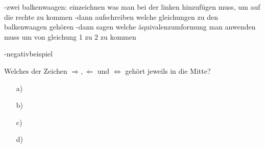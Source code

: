 \documentclass[solution]{uebungsblatt}
\begin{document}
-zwei balkenwaagen: einzeichnen was man bei der linken hinzufügen muss, um auf die rechte zu kommen
    -dann aufschreiben welche gleichungen zu den balkenwaagen gehören
    -dann sagen welche äquivalenzumformung man anwenden muss um von gleichung 1 zu 2 zu kommen

-negativbeispiel

\begin{exercise}{}
    Welches der Zeichen $\Rightarrow, \Leftarrow$ und $\Leftrightarrow$ gehört jeweils in die Mitte?
    \begin{multicols}{2}
        \begin{enumerate}
            \item[a)]
            \item[b)]
            \item[c)]
            \item[d)]
        \end{enumerate}
    \end{multicols}
\end{exercise}
\end{document}
